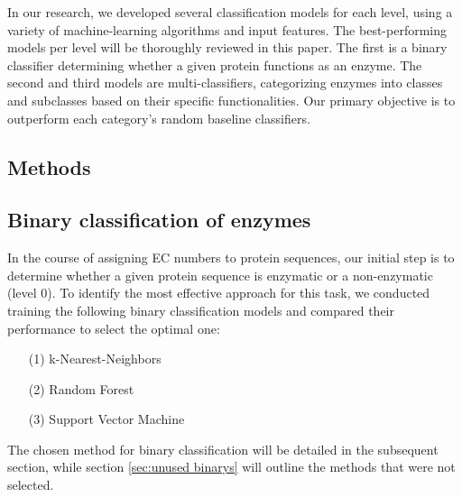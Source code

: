 \documentclass{bioinfo}
\begin{document}
In our research, we developed several classification models for each level, using a variety of machine-learning algorithms and input features.
The best-performing models per level will be thoroughly reviewed in this paper.
The first is a binary classifier determining whether a given protein functions as an enzyme. 
The second and third models are multi-classifiers, categorizing enzymes into classes and subclasses 
based on their specific functionalities. 
Our primary objective is to outperform each category's random baseline classifiers.

\begin{methods}
\section{Methods}

\subsection{Binary classification of enzymes}
In the course of assigning EC numbers to protein sequences,
our initial step is to determine whether a given protein sequence is enzymatic or a non-enzymatic (level 0).
To identify the most effective approach for this task,
we conducted training the following binary classification models and compared their performance to select the optimal one:
\begin{enumerate}
	\item[(1)] k-Nearest-Neighbors
	\item[(2)] Random Forest 
	\item[(3)] Support Vector Machine
\end{enumerate}

The chosen method for binary classification will be detailed in the subsequent section, while section \ref{sec:unused binarys} will outline the methods that were not selected.



\end{methods}
\end{document}
